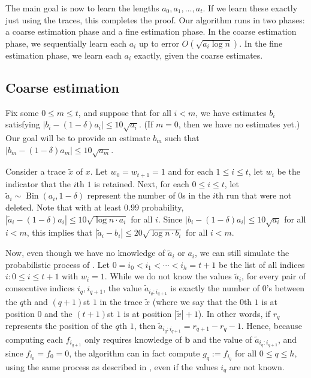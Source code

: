 \documentclass[12pt]{article}
\theoremstyle{definition}
\theoremstyle{remark}
\DeclareMathOperator{\Bin}{Bin}
\newcommand{\bb}{\mathbf b}
\begin{document}
The main goal is now to learn the lengths $a_0, a_1, \dots, a_t$. If we learn these exactly just using the traces, this completes the proof. Our algorithm runs in two phases: a coarse estimation phase and a fine estimation phase. In the coarse estimation phase, we sequentially learn each $a_i$ up to error $O(\sqrt{a_i \log n})$. In the fine estimation phase, we learn each $a_i$ exactly, given the coarse estimates.

\subsection{Coarse estimation}

Fix some $0 \le m \le t$, and suppose that for all $i < m$, we have estimates $b_i$ satisfying $|b_i-(1-\delta) a_i| \le 10 \sqrt{a_i}$. (If $m = 0$, then we have no estimates yet.) Our goal will be to provide an estimate $b_m$ such that $|b_m-(1-\delta) a_m| \le 10 \sqrt{a_m}$.

Consider a trace $\tilde{x}$ of $x$. Let $w_0 = w_{t+1} = 1$ and for each $1 \le i \le t$, let $w_i$ be the indicator that the $i$th $1$ is retained. Next, for each $0 \le i \le t$, let $\tilde{a}_i \sim \Bin(a_i, 1-\delta)$ represent the number of $0$s in the $i$th run that were not deleted. Note that with at least $0.99$ probability, $|\tilde{a}_i-(1-\delta) a_i| \le 10 \sqrt{\log n \cdot a_i}$ for all $i$. Since $|b_i-(1-\delta) a_i| \le 10 \sqrt{a_i}$ for all $i < m$, this implies that $|\tilde{a}_i-b_i| \le 20 \sqrt{\log n \cdot b_i}$ for all $i < m$.

Now, even though we have no knowledge of $\tilde{a}_i$ or $a_i$, we can still simulate the probabilistic process of . Let $0 = i_0 < i_1 < \cdots < i_h = t+1$ be the list of all indices $i: 0 \le i \le t+1$ with $w_i = 1$. While we do not know the values $\tilde{a}_i$, for every pair of consecutive indices $i_q, i_{q+1}$, the value $\tilde{a}_{i_q:i_{q+1}}$ is exactly the number of $0$'s between the $q$th and $(q+1)$st $1$ in the trace $\tilde{x}$ (where we say that the $0$th $1$ is at position $0$ and the $(t+1)$st $1$ is at position $|\tilde{x}|+1$). In other words, if $r_q$ represents the position of the $q$th $1$, then $\tilde{a}_{i_q:i_{q+1}} = r_{q+1}-r_q-1$. Hence, because computing each $f_{i_{q+1}}$ only requires knowledge of $\bb$ and the value of $\tilde{a}_{i_q:i_{q+1}}$, and since $f_{i_0} = f_0 = 0$, the algorithm can in fact compute $g_q := f_{i_q}$ for all $0 \le q \le h$, using the same process as described in , even if the values $i_q$ are not known.
\end{document}
